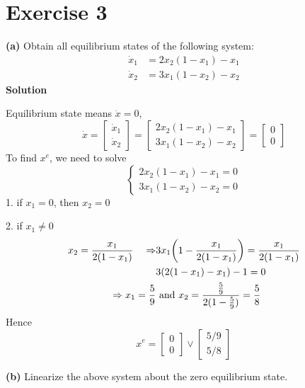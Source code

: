 \documentclass[12pt,a4paper]{article}
\begin{document}
\section*{Exercise 3}
\textbf{(a)} Obtain all equilibrium states of the following system:
\[
\begin{aligned}
\dot x_1 &= 2x_2(1-x_1)-x_1\\
\dot x_2 &= 3x_1(1-x_2)-x_2
\end{aligned}
\]
\textbf{Solution}

Equilibrium state means $\dot x = 0$, 
\[
	\dot x = \begin{bmatrix}
		\dot x_1 \\ \dot x_2
	\end{bmatrix} = \begin{bmatrix}
	2 x_2 (1 - x_1) - x_1 \\
	3 x_1 (1 - x_2) - x_2 
	\end{bmatrix} = \begin{bmatrix}
	0 \\ 0
	\end{bmatrix} 
\]
To find $x^e$, we need to solve
\[
\begin{cases}
		2 x_2 (1 - x_1) - x_1 = 0\\
	3 x_1 (1 - x_2) - x_2 =0
\end{cases}
\]
1. if $x_1 = 0$, then $x_2 = 0$

2. if $x_1 \neq 0$
\begin{align*}
x_2 = { x_1 \over 2(1- x_1)}\quad \Rightarrow& 3 x_1 \bigg(1 -  { x_1 \over 2(1- x_1)}\bigg) = { x_1 \over 2(1- x_1)} \\
& 3 (2 (1 - x_1) - x_1) - 1 = 0 \\
\Rightarrow x_1 = {5\over9} &\text{ and } x_2 = {{5\over9}\over2(1 - {5\over9})} = {5\over8}
\end{align*}
Hence
\[
x^e = \begin{bmatrix}
	0 \\ 0
\end{bmatrix} \lor \begin{bmatrix}
5/9 \\ 5/8
\end{bmatrix}
\]

\textbf{(b)} Linearize the above system about the zero equilibrium state.
\end{document}
